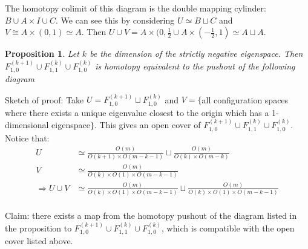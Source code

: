 \documentclass{article}
\newtheorem{proposition}[theorem]{Proposition}
\newtheorem{proposed work}[theorem]{Proposed Work}
\begin{document}
The homotopy colimit of this diagram is the double mapping cylinder: $B\cup A\times I \cup C$. We can see this by considering $U\simeq B\sqcup C$ and $V\cong A\times (0,1)\simeq A$. Then $U\cup V=A\times (0,\frac{1}{2}\cup A\times (-\frac{1}{2},1)\simeq A\sqcup A$.\\

\begin{proposition}
Let $k$ be the dimension of the strictly negative eigenspace. Then $F_{1,0}^{(k+1)}\cup F_{1,1}^{(k)}\cup F_{1,0}^{(k)}$ is homotopy equivalent to the pushout of the following diagram
	\begin{center}
	\end{center}
\end{proposition}

Sketch of proof: Take $U=F_{1,0}^{(k+1)}\sqcup F_{1,0}^{(k)}$ and $V=\lbrace$all configuration spaces where there exists a unique eigenvalue closest to the origin which has a 1-dimensional eigenspace$\rbrace$. This gives an open cover of $F_{1,0}^{(k+1)}\cup F_{1,1}^{(k)}\cup F_{1,0}^{(k)}$.\\

Notice that: 
\begin{align*}
U &\simeq \frac{O(m)}{O(k+1)\times O(m-k-1)}\sqcup \frac{O(m)}{O(k)\times O(m-k)}\\
V &\simeq \frac{O(m)}{O(k)\times O(1)\times O(m-k-1)}\\
\Rightarrow U\cup V &\simeq \frac{O(m)}{O(k)\times O(1)\times O(m-k-1)}\sqcup \frac{O(m)}{O(k)\times O(1)\times O(m-k-1)}\\
\end{align*}

Claim: there exists a map from the homotopy pushout of the diagram listed in the proposition to $F_{1,0}^{(k+1)}\cup F_{1,1}^{(k)}\cup F_{1,0}^{(k)}$, which is compatible with the open cover listed above. 
\end{document}
